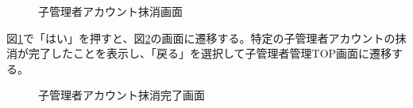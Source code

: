 \documentclass[a4j]{jarticle}
\begin{document}
\begin{figure}[H]
\centering
{}
\caption{子管理者アカウント抹消画面}
\label{fig:delete_admin}
\end{figure}
図\ref{fig:delete_admin}で「はい」を押すと、図\ref{fig:delete_admin_ok}の画面に遷移する。特定の子管理者アカウントの抹消が完了したことを表示し、「戻る」を選択して子管理者管理TOP画面に遷移する。
\begin{figure}[H]
\centering
{}
\caption{子管理者アカウント抹消完了画面}
\label{fig:delete_admin_ok}
\end{figure}

\end{document}
